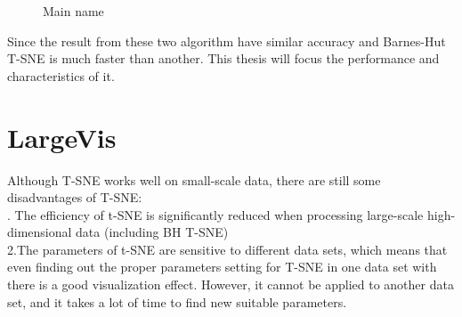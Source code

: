 \begin{figure}[H]
\centering  %
\caption{Main name}
\label{Fig.main}
\end{figure}

\noindent Since the result from these two algorithm have similar accuracy and Barnes-Hut T-SNE is much faster than another. This thesis will focus the performance and characteristics of it.


\chapter{LargeVis}



\noindent  Although T-SNE works well on small-scale data, there are still some disadvantages of T-SNE:\\

. The efficiency of t-SNE is significantly reduced when processing large-scale high-dimensional data (including BH T-SNE)\\

\noindent 2.The parameters of t-SNE are sensitive to different data sets, which means that even finding out the proper parameters setting for T-SNE in one data set with there is a good visualization effect. However, it cannot be applied to another data set, and it takes a lot of time to find new suitable parameters.\\

